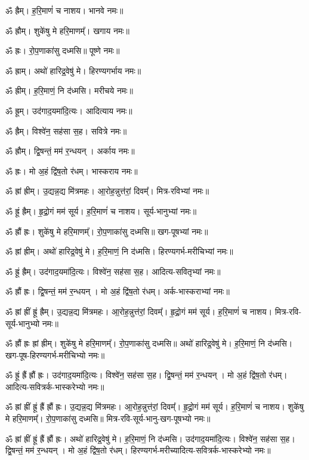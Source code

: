 ॐ ह्रैम्।  ह॒रि॒माणं॑ च नाशय। भानवे नमः॥

ॐ ह्रौम्।  शुके॑षु मे हरि॒माणम्᳚। खगाय नमः॥

ॐ ह्रः। रो॒प॒णाका॑सु दध्मसि॥ पूष्णे नमः॥

ॐ ह्राम्।  अथो॑ हारिद्र॒वेषु॑ मे। हिरण्यगर्भाय नमः॥

ॐ ह्रीम्।  ह॒रि॒माणं॒ नि द॑ध्मसि। मरीचये नमः॥

ॐ ह्रूम्।  उद॑गाद॒यमा॑दि॒त्यः। आदित्याय नमः॥

ॐ ह्रैम्।  विश्वे॑न॒ सह॑सा स॒ह। सवित्रे नमः॥

ॐ ह्रौम्।  द्वि॒षन्तं॒ मम॑ र॒न्धयन्। अर्काय नमः॥

ॐ ह्रः। मो अ॒हं द्वि॑ष॒तो र॑धम्। भास्कराय नमः॥


ॐ ह्रां ह्रीम्। उ॒द्यन्न॒द्य मि॑त्रमहः।  आ॒रोह॒न्नुत्त॑रां॒ दिवम्᳚। मित्र-रविभ्यां नमः॥

ॐ ह्रूं ह्रैम्। हृ॒द्रो॒गं मम॑ सूर्य। ह॒रि॒माणं॑ च नाशय। सूर्य-भानुभ्यां नमः॥

ॐ ह्रौं ह्रः। शुके॑षु मे हरि॒माणम्᳚। रो॒प॒णाका॑सु दध्मसि॥ खग-पूषभ्यां नमः॥

ॐ ह्रां ह्रीम्। अथो॑ हारिद्र॒वेषु॑ मे। ह॒रि॒माणं॒ नि द॑ध्मसि। हिरण्यगर्भ-मरीचिभ्यां नमः॥

ॐ ह्रूं ह्रैम्। उद॑गाद॒यमा॑दि॒त्यः। विश्वे॑न॒ सह॑सा स॒ह। आदित्य-सवितृभ्यां नमः॥

ॐ ह्रौं ह्रः। द्वि॒षन्तं॒ मम॑ र॒न्धयन्। मो अ॒हं द्वि॑ष॒तो र॑धम्। अर्क-भास्कराभ्यां नमः॥


ॐ ह्रां ह्रीं ह्रूं ह्रैम्। उ॒द्यन्न॒द्य मि॑त्रमहः। आ॒रोह॒न्नुत्त॑रां॒ दिवम्᳚। हृ॒द्रो॒गं मम॑ सूर्य। ह॒रि॒माणं॑ च नाशय। मित्र-रवि-सूर्य-भानुभ्यो नमः॥

ॐ ह्रौं ह्रः ह्रां ह्रीम्। शुके॑षु मे हरि॒माणम्᳚। रो॒प॒णाका॑सु दध्मसि॥ अथो॑ हारिद्र॒वेषु॑ मे। ह॒रि॒माणं॒ नि द॑ध्मसि। खग-पूष-हिरण्यगर्भ-मरीचिभ्यो नमः॥

ॐ ह्रूं ह्रैं ह्रौं ह्रः। उद॑गाद॒यमा॑दि॒त्यः। विश्वे॑न॒ सह॑सा स॒ह। द्वि॒षन्तं॒ मम॑ र॒न्धयन्। मो अ॒हं द्वि॑ष॒तो र॑धम्। आदित्य-सवित्रर्क-भास्करेभ्यो नमः॥

ॐ ह्रां ह्रीं ह्रूं ह्रैं ह्रौं ह्रः।
उ॒द्यन्न॒द्य मि॑त्रमहः। आ॒रोह॒न्नुत्त॑रां॒ दिवम्᳚। हृ॒द्रो॒गं मम॑ सूर्य। ह॒रि॒माणं॑ च नाशय। शुके॑षु मे हरि॒माणम्᳚। रो॒प॒णाका॑सु दध्मसि॥ 
मित्र-रवि-सूर्य-भानु-खग-पूषभ्यो नमः॥


ॐ ह्रां ह्रीं ह्रूं ह्रैं ह्रौं ह्रः।
अथो॑ हारिद्र॒वेषु॑ मे। ह॒रि॒माणं॒ नि द॑ध्मसि। उद॑गाद॒यमा॑दि॒त्यः। विश्वे॑न॒ सह॑सा स॒ह। द्वि॒षन्तं॒ मम॑ र॒न्धयन्। मो अ॒हं द्वि॑ष॒तो र॑धम्।
हिरण्यगर्भ-मरीच्यादित्य-सवित्रर्क-भास्करेभ्यो नमः॥

